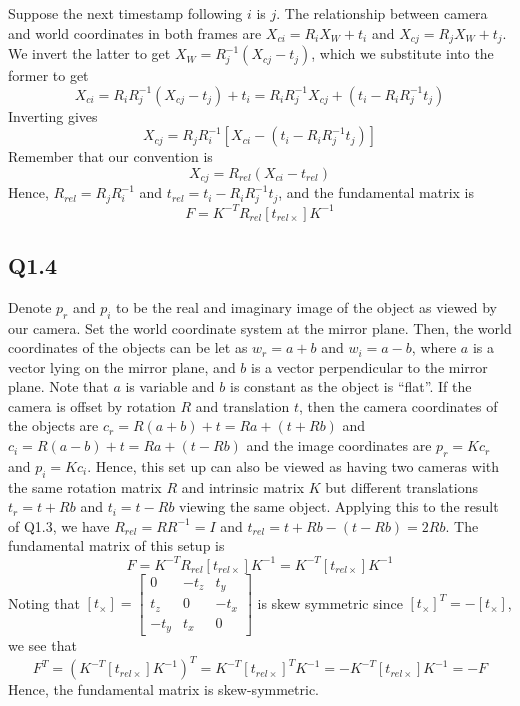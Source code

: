 \documentclass{scrbook}
\begin{document}
Suppose the next timestamp following $i$ is $j$. The relationship between camera and world coordinates in both frames are $X_{ci}=R_{i}X_{W}+t_{i}$ and $X_{cj}=R_{j}X_{W}+t_{j}$. We invert the latter to get $X_{W}={R}_{j}^{-1}(X_{cj}-t_{j})$, which we substitute into the former to get
\begin{equation*}
X_{ci}=R_{i}{R}_{j}^{-1}\left(X_{cj}-t_{j}\right)+t_{i}=R_{i}{R}_{j}^{-1}X_{cj}+\left(t_{i}-R_{i}{R}_{j}^{-1}t_{j}\right)
\end{equation*}
Inverting gives
\begin{equation*}
X_{cj}=R_{j}{R}_{i}^{-1}\left[X_{ci}-\left(t_{i}-R_{i}{R}_{j}^{-1}t_{j}\right)\right]
\end{equation*}
Remember that our convention is
\begin{equation*}
X_{cj}=R_{rel}\left(X_{ci}-t_{rel}\right)
\end{equation*}
Hence, $R_{rel}=R_{j}{R}_{i}^{-1}$ and $t_{rel}=t_{i}-R_{i}{R}_{j}^{-1}t_{j}$, and the fundamental matrix is
\begin{equation*}
F=K^{-T}R_{rel}\left[t_{rel\times }\right]K^{-1}
\end{equation*}
\subsection{Q1.4}

Denote $p_{r}$ and $p_{i}$ to be the real and imaginary image of the object as viewed by our camera. Set the world coordinate system at the mirror plane. Then, the world coordinates of the objects can be let as $w_{r}=a+b$ and $w_{i}=a-b$, where $a$ is a vector lying on the mirror plane, and $b$ is a vector perpendicular to the mirror plane. Note that $a$ is variable and $b$ is constant as the object is ``flat''. If the camera is offset by rotation $R$ and translation $t$, then the camera coordinates of the objects are $c_{r}=R\left(a+b\right)+t=Ra+(t+Rb)$ and $c_{i}=R\left(a-b\right)+t=Ra+(t-Rb)$ and the image coordinates are $p_{r}=Kc_{r}$ and $p_{i}=Kc_{i}$. Hence, this set up can also be viewed as having two cameras with the same rotation matrix $R$ and intrinsic matrix $K$ but different translations $t_{r}=t+Rb$ and $t_{i}=t-Rb$ viewing the same object. Applying this to the result of Q1.3, we have $R_{rel}=RR^{-1}=I$ and $t_{rel}=t+Rb-\left(t-Rb\right)=2Rb$. The fundamental matrix of this setup is
\begin{equation*}
F=K^{-T}R_{rel}\left[t_{rel\times }\right]K^{-1}=K^{-T}\left[t_{rel\times }\right]K^{-1}
\end{equation*}
Noting that $\left[t_{\times }\right]=\left[\begin{array}{ccc}
0 & -t_{z} & t_{y}\\
t_{z} & 0 & -t_{x}\\
-t_{y} & t_{x} & 0
\end{array}\right]$ is skew symmetric since $\left[t_{\times }\right]^{T}=-\left[t_{\times }\right]$, we see that 
\begin{equation*}
F^{T}=\left(K^{-T}\left[t_{rel\times }\right]K^{-1}\right)^{T}=K^{-T}\left[t_{rel\times }\right]^{T}K^{-1}=-K^{-T}\left[t_{rel\times }\right]K^{-1}=-F
\end{equation*}
Hence, the fundamental matrix is skew-symmetric.
\end{document}
